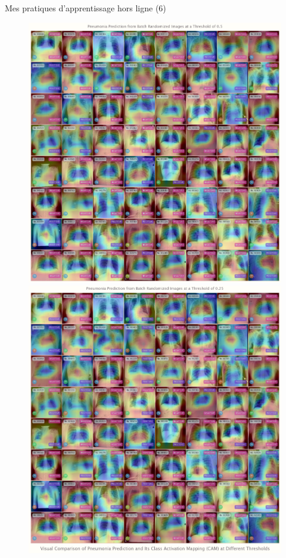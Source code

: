 \documentclass{beamer}
\begin{document}
	\begin{frame}[fragile]{Mes pratiques d'apprentissage hors ligne (6)}
		\begin{figure}[!htb]
			\vspace{-.25em}
			\endminipage\hfill
			\centering\includegraphics[width=\linewidth]{images/deep_learning_6_1_1.png}
			\endminipage\hfill
			\centering\includegraphics[width=\linewidth]{images/deep_learning_6_1_2.png}

\end{figure}
\end{frame}
\end{document}
